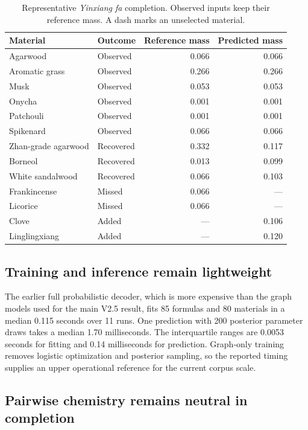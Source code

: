 \documentclass[11pt,a4paper]{article}
\begin{document}
\begin{table}[t]
\centering
\caption{Representative \emph{Yinxiang fa} completion. Observed inputs keep their reference mass. A dash marks an unselected material.}
\label{tab:case}
\begin{tabular}{llrr}
\toprule
Material & Outcome & Reference mass & Predicted mass \\
\midrule
Agarwood & Observed & 0.066 & 0.066 \\
Aromatic grass & Observed & 0.266 & 0.266 \\
Musk & Observed & 0.053 & 0.053 \\
Onycha & Observed & 0.001 & 0.001 \\
Patchouli & Observed & 0.001 & 0.001 \\
Spikenard & Observed & 0.066 & 0.066 \\
Zhan-grade agarwood & Recovered & 0.332 & 0.117 \\
Borneol & Recovered & 0.013 & 0.099 \\
White sandalwood & Recovered & 0.066 & 0.103 \\
Frankincense & Missed & 0.066 & --- \\
Licorice & Missed & 0.066 & --- \\
Clove & Added & --- & 0.106 \\
Linglingxiang & Added & --- & 0.120 \\
\bottomrule
\end{tabular}
\end{table}

\subsection{Training and inference remain lightweight}

The earlier full probabilistic decoder, which is more expensive than the graph models used for the main V2.5 result, fits 85 formulas and 80 materials in a median 0.115 seconds over 11 runs. One prediction with 200 posterior parameter draws takes a median 1.70 milliseconds. The interquartile ranges are 0.0053 seconds for fitting and 0.14 milliseconds for prediction. Graph-only training removes logistic optimization and posterior sampling, so the reported timing supplies an upper operational reference for the current corpus scale.

\subsection{Pairwise chemistry remains neutral in completion}
\end{document}
